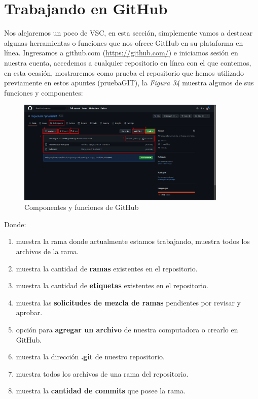\section{Trabajando en GitHub}
\hspace{0.55cm}Nos alejaremos un poco de VSC, en esta sección, simplemente vamos a destacar algunas herramientas o funciones que nos ofrece GitHub en su plataforma en línea. Ingresamos a github.com (\underline{https://github.com/}) e iniciamos sesión en nuestra cuenta, accedemos a cualquier repositorio en línea con el que contemos, en esta ocasión, mostraremos como prueba el repositorio que hemos utilizado previamente en estos apuntes (pruebaGIT), la \textit{Figura 34} muestra algunos de sus funciones y componentes:
\begin{figure}[H]
    \begin{center}
        \caption{Componentes y funciones de GitHub}
        \label{fig: 34}
        \includegraphics[width=10cm]{capturas/github.png}
    \end{center}
\end{figure}

Donde:
\begin{enumerate}
    \item muestra la rama donde actualmente estamos trabajando, muestra todos los archivos de la rama.
    \item muestra la cantidad de \textbf{ramas} existentes en el repositorio.
    \item muestra la cantidad de \textbf{etiquetas} existentes en el repositorio.
    \item muestra las \textbf{solicitudes de mezcla de ramas} pendientes por revisar y aprobar.
    \item opción para \textbf{agregar un archivo} de nuestra computadora o crearlo en GitHub.
    \item muestra la dirección \textbf{.git} de nuestro repositorio.
    \item muestra todos los archivos de una rama del repositorio.
    \item muestra la \textbf{cantidad de commits} que posee la rama.
\end{enumerate}





